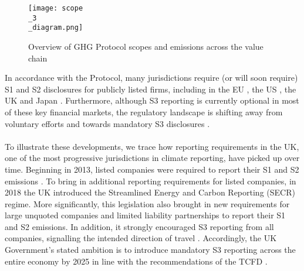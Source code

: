 \documentclass[12pt,twoside]{report}
\newcommand\fnote[1]{\captionsetup{font=scriptsize, justification=raggedright, singlelinecheck=false}\subcaption*{\textit{#1}}}
\begin{document}
\begin{figure}[H]
	\centering
	\caption{Overview of GHG Protocol scopes and emissions across the value chain}
	\label{fig:Scope3Diagram}
	\texttt{[image: scope\\\_3\\\_diagram.png]}
	\fnote{Source: \cite{ghgscope32013}, p.6}
\end{figure}

In accordance with the Protocol, many jurisdictions require (or will soon require) S1 and S2 disclosures for publicly listed firms, including in the EU \cite{eu20232772}, the US \cite{sec2024}, the UK \cite{ukleg2013} and Japan \cite{fsa2022}. Furthermore, although S3 reporting is currently optional in most of these key financial markets, the regulatory landscape is shifting away from voluntary efforts and towards mandatory S3 disclosures \cite{ftserussell2024}. 
\\ \\
To illustrate these developments, we trace how reporting requirements in the UK, one of the most progressive jurisdictions in climate reporting, have picked up over time. Beginning in 2013, listed companies were required to report their S1 and S2 emissions \cite{ukleg2013}. To bring in additional reporting requirements for listed companies, in 2018 the UK introduced the Streamlined Energy and Carbon Reporting (SECR) regime. More significantly, this legislation also brought in new requirements for large unquoted companies and limited liability partnerships to report their S1 and S2 emissions. In addition, it strongly encouraged S3 reporting from all companies, signalling the intended direction of travel \cite{UKSECRGuidance2019}. Accordingly, the UK Government's stated ambition is to introduce mandatory S3 reporting across the entire economy by 2025 in line with the recommendations of the TCFD \cite{ukgov2020}. 
\end{document}
